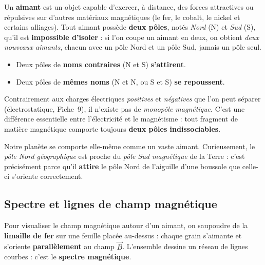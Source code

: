 \documentclass[11pt,a4paper]{article}
\newcommand{\Bvec}{\vec{B}}
\begin{document}
\begin{definition}
Un \textbf{aimant} est un objet capable d'exercer, à distance, des forces attractives ou répulsives
sur d'autres matériaux magnétiques (le fer, le cobalt, le nickel et certains alliages). Tout aimant
possède \textbf{deux pôles}, notés \emph{Nord} (N) et \emph{Sud} (S), qu'il est
\textbf{impossible d'isoler} : si l'on coupe un aimant en deux, on obtient \emph{deux nouveaux aimants},
chacun avec un pôle Nord et un pôle Sud, jamais un pôle seul.
\end{definition}

\begin{theoreme}
\hfill
\begin{itemize}[leftmargin=1.6em,topsep=2pt,itemsep=1pt]
  \item Deux pôles de \textbf{noms contraires} (N et S) \textbf{s'attirent}.
  \item Deux pôles de \textbf{mêmes noms} (N et N, ou S et S) \textbf{se repoussent}.
\end{itemize}
\end{theoreme}

\begin{attention}
Contrairement aux charges électriques \emph{positives} et \emph{négatives} que l'on peut séparer
(électrostatique, Fiche~9), il n'existe pas de \emph{monopôle magnétique}. C'est une différence
essentielle entre l'électricité et le magnétisme : tout fragment de matière magnétique comporte
toujours \textbf{deux pôles indissociables}.
\end{attention}

\begin{remarque}
Notre planète se comporte elle-même comme un vaste aimant. Curieusement, le \emph{pôle Nord
géographique} est proche du \emph{pôle Sud magnétique} de la Terre : c'est précisément parce qu'il
\textbf{attire} le pôle Nord de l'aiguille d'une boussole que celle-ci s'oriente correctement.
\end{remarque}

\subsection{Spectre et lignes de champ magnétique}

Pour visualiser le champ magnétique autour d'un aimant, on saupoudre de la \textbf{limaille de fer}
sur une feuille placée au-dessus : chaque grain s'aimante et s'oriente \textbf{parallèlement} au
champ $\Bvec$. L'ensemble dessine un réseau de lignes courbes : c'est le \textbf{spectre magnétique}.
\end{document}
